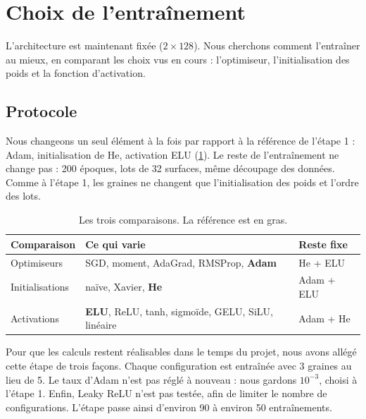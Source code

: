 
\section{Choix de l'entraînement}
\label{sec-entrainement}

L'architecture est maintenant fixée ($2\times128$). Nous cherchons comment l'entraîner au mieux, en comparant
les choix vus en cours : l'optimiseur, l'initialisation des poids et la fonction d'activation.

\subsection{Protocole}
\label{sec-entr-protocole}

Nous changeons un seul élément à la fois par rapport à la référence de l'étape 1 : Adam, initialisation de He,
activation ELU (\cref{tab-comparaisons}). Le reste de l'entraînement ne change pas : 200 époques, lots de 32
surfaces, même découpage des données. Comme à l'étape 1, les graines ne changent que l'initialisation des poids
et l'ordre des lots.

\begin{table}[H]
  \centering
  \caption{Les trois comparaisons. La référence est en gras.}
  \label{tab-comparaisons}
  \small
  \begin{tabular}{lll}
    \toprule
    Comparaison & Ce qui varie & Reste fixe \\
    \midrule
    Optimiseurs      & SGD, moment, AdaGrad, RMSProp, \textbf{Adam} & He + ELU \\
    Initialisations  & naïve, Xavier, \textbf{He}                   & Adam + ELU \\
    Activations      & \textbf{ELU}, ReLU, tanh, sigmoïde, GELU, SiLU, linéaire & Adam + He \\
    \bottomrule
  \end{tabular}
\end{table}

Pour que les calculs restent réalisables dans le temps du projet, nous avons allégé cette étape de trois façons.
Chaque configuration est entraînée avec 3 graines au lieu de 5. Le taux d'Adam n'est pas réglé à nouveau : nous
gardons $10^{-3}$, choisi à l'étape 1. Enfin, Leaky ReLU n'est pas testée, afin de limiter le nombre de
configurations. L'étape passe ainsi d'environ 90 à environ 50 entraînements.

